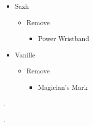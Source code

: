 	\begin{menu}
		\begin{itemize}
			\equip
			\begin{itemize}
				\item Sazh
				      \begin{itemize}
					      \item Remove
					            \begin{itemize}
						            \item Power Wristband
					            \end{itemize}
				      \end{itemize}
				\item Vanille
				      \begin{itemize}
					      \item Remove
					            \begin{itemize}
						            \item Magician's Mark
					            \end{itemize}
				      \end{itemize}
			\end{itemize}
		\end{itemize}
	\end{menu}


	.

	.